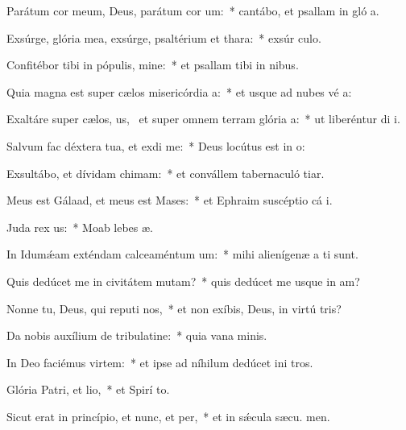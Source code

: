 \item Parátum cor meum, Deus, parátum cor um:~* cantábo, et psallam in gló a.
\item Exsúrge, glória mea, exsúrge, psaltérium et thara:~* exsúr culo.
\item Confitébor tibi in pópulis, mine:~* et psallam tibi in nibus.
\item Quia magna est super cælos misericórdia a:~* et usque ad nubes vé a:
\item Exaltáre super cælos, us,~\pscross{} et super omnem terram glória a:~* ut liberéntur di i.
\item Salvum fac déxtera tua, et exdi me:~* Deus locútus est in  o:
\item Exsultábo, et dívidam chimam:~* et convállem tabernaculó tiar.
\item Meus est Gálaad, et meus est Mases:~* et Ephraim suscéptio cá i.
\item Juda rex us:~* Moab lebes  æ.
\item In Idumǽam exténdam calceaméntum um:~* mihi alienígenæ a ti sunt.
\item Quis dedúcet me in civitátem mutam?~* quis dedúcet me usque in am?
\item Nonne tu, Deus, qui reputi nos,~* et non exíbis, Deus, in virtú tris?
\item Da nobis auxílium de tribulatine:~* quia vana  minis.
\item In Deo faciémus virtem:~* et ipse ad níhilum dedúcet ini tros.
\item Glória Patri, et lio,~* et Spirí to.
\item Sicut erat in princípio, et nunc, et per,~* et in sǽcula sæcu. men.
